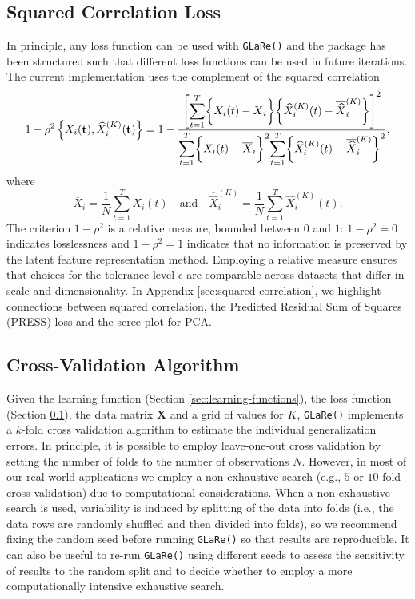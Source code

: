 \subsection{Squared Correlation Loss}\label{sec:loss-functions}

In principle, any loss function can be used with \texttt{GLaRe()} and the package has been structured such that different loss functions can be used in future iterations.
The current implementation uses the complement of the squared correlation
$$
1- \rho^2 \left\{X_i (\mathbf{t}), \widehat{X}^{(K)}_{i} (\mathbf{t}) \right\} =
1 - \frac{\left[ \mathlarger{\sum}_{t = 1}^T{\bigg\{X_i (t) - \overline{X}_i \bigg\} \bigg\{ \widehat{X}_i^{(K)} (t) - \overline{\widehat{X}}_i^{(K)} \bigg\}} \right]^2}{\mathlarger{\sum}_{t = 1}^T \bigg\{X_i (t) - \overline{X}_i \bigg\}^2 \mathlarger{\sum}_{t = 1}^T \bigg\{ \widehat{X}_i^{(K)} (t) - \overline{\widehat{X}}_i^{(K)} \bigg\} ^2},
$$
where
$$
\overline{X}_i = \frac{1}{N} \sum_{t=1}^T X_i (t) \quad \text{and} \quad \overline{\widehat{X}}_i^{(K)} = \frac{1}{N} \sum_{t=1}^T \widehat{X}_i^{(K)} (t).
$$
The criterion $1- \rho^2$ is a relative measure, bounded between $0$ and $1$: $1- \rho^2 = 0$ indicates losslessness and $1- \rho^2 = 1$ indicates that no information is preserved by the latent feature representation method.
Employing a relative measure ensures that choices for the tolerance level $\epsilon$ are comparable across datasets that differ in scale and dimensionality.
In Appendix \ref{sec:squared-correlation}, we highlight connections between squared correlation, the Predicted Residual Sum of Squares (PRESS) loss and the scree plot for PCA.

\subsection{Cross-Validation Algorithm}

Given the learning function (Section \ref{sec:learning-functions}), the loss function (Section \ref{sec:loss-functions}), the data matrix $\mathbf{X}$ and a grid of values for $K$, \texttt{GLaRe()} implements a $k$-fold cross validation algorithm to estimate the individual generalization errors.
In principle, it is possible to employ leave-one-out cross validation by setting the number of folds to the number of observations $N$.
However, in most of our real-world applications we employ a non-exhaustive search (e.g., $5$ or $10$-fold cross-validation) due to computational considerations.
When a non-exhaustive search is used, variability is induced by splitting of the data into folds (i.e., the data rows are randomly shuffled and then divided into folds), so we recommend fixing the random seed before running \texttt{GLaRe()} so that results are reproducible.
It can also be useful to re-run \texttt{GLaRe()} using different seeds to assess the sensitivity of results to the random split and to decide whether to employ a more computationally intensive exhaustive search.

